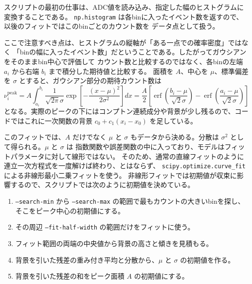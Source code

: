 \documentclass[uplatex,dvipdfmx,12pt,nomag]{jsarticle}
\begin{document}
スクリプトの最初の仕事は、ADC値を読み込み、指定した幅のヒストグラムに変換することである。
\texttt{np.histogram} は各binに入ったイベント数を返すので、以後のフィットではこのbinごとのカウント数を
データ点として扱う。



ここで注意すべき点は、ヒストグラムの縦軸が「ある一点での確率密度」ではなく
「binの幅に入ったイベント数」だということである。したがってガウシアンをそのままbin中心で評価して
カウント数と比較するのではなく、各binの左端 $a_i$ から右端 $b_i$ まで積分した期待値と比較する。
面積を $A$、中心を $\mu$、標準偏差を $\sigma$ とすると、ガウシアン部分の期待カウント数は
\begin{equation}
  \nu_i^{\mathrm{peak}}
  =
  A \int_{a_i}^{b_i}
  \frac{1}{\sqrt{2\pi}\sigma}
  \exp\left[-\frac{(x-\mu)^2}{2\sigma^2}\right] dx
  =
  \frac{A}{2}
  \left[
  \operatorname{erf}\left(\frac{b_i-\mu}{\sqrt{2}\sigma}\right)
  -
  \operatorname{erf}\left(\frac{a_i-\mu}{\sqrt{2}\sigma}\right)
  \right]
\end{equation}
となる。実際のピークの下にはコンプトン連続成分や背景が少し残るので、コードではこれに一次関数の背景
$c_0+c_1(x_i-x_0)$ を足している。



このフィットでは、$A$ だけでなく $\mu$ と $\sigma$ もデータから決める。分散は
$\sigma^2$ として得られる。$\mu$ と $\sigma$ は
指数関数や誤差関数の中に入っており、モデルはフィットパラメータに対して線形ではない。
そのため、通常の直線フィットのように連立一次方程式を一度解けば終わり、とはならず、
\texttt{scipy.optimize.curve\_fit} による非線形最小二乗フィットを使う。
非線形フィットでは初期値が収束に影響するので、スクリプトでは次のように初期値を決めている。

\begin{enumerate}
  \renewcommand{\labelenumi}{（\arabic{enumi}）}
  \item \texttt{--search-min} から \texttt{--search-max} の範囲で最もカウントの大きいbinを探し、そこをピーク中心の初期値にする。
  \item その周辺 \texttt{--fit-half-width} の範囲だけをフィットに使う。
  \item フィット範囲の両端の中央値から背景の高さと傾きを見積もる。
  \item 背景を引いた残差の重み付き平均と分散から、$\mu$ と $\sigma$ の初期値を作る。
  \item 背景を引いた残差の和をピーク面積 $A$ の初期値にする。
\end{enumerate}
\end{document}
